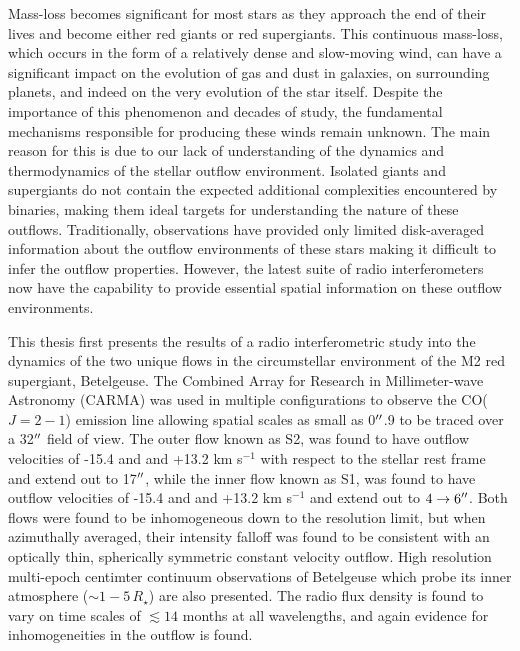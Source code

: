 
\begin{abstracts} 

Mass-loss becomes significant for most stars as they approach the end of their lives and become either red giants or red supergiants. This continuous mass-loss, which occurs in the form of a relatively dense and slow-moving wind, can have a significant impact on the evolution of gas and dust in galaxies, on surrounding planets, and indeed on the very evolution of the star itself.  Despite the importance of this phenomenon and decades of study,
the fundamental mechanisms responsible for producing these winds remain unknown. The main reason for this is due to our lack of understanding of the dynamics and thermodynamics of the stellar outflow environment. Isolated giants and supergiants do not contain the expected additional complexities encountered by binaries, making them ideal targets for understanding the nature of these outflows. Traditionally, observations have provided only limited disk-averaged information about the outflow environments of these stars making it difficult to infer the outflow properties. However, the latest suite of radio interferometers now have the capability to provide essential spatial information on these outflow environments.

This thesis first presents the results of a radio interferometric study into the dynamics of the two unique flows in the circumstellar environment of the  M2 red supergiant, Betelgeuse. The  Combined Array for Research in Millimeter-wave Astronomy (CARMA) was used in multiple configurations to observe the CO($J=2-1$) emission line allowing  spatial scales as small as 0$^{\prime\prime}$.9 to be traced over a 32$^{\prime\prime}$  field of view. The outer flow known as S2, was found to have outflow velocities of -15.4 and and +13.2 km s$^{-1}$ with respect to the stellar rest frame and extend out to 17$^{\prime\prime}$, while the inner flow known as S1, was found to have outflow velocities of -15.4 and and +13.2 km s$^{-1}$ and extend out to $4 \rightarrow 6^{\prime\prime}$. Both flows were found to be inhomogeneous down to the resolution limit, but when azimuthally averaged, their intensity falloff was found to be consistent with an optically thin, spherically symmetric constant velocity outflow. High resolution multi-epoch centimter continuum observations of Betelgeuse which probe its inner atmosphere ($\sim 1-5\,R_{\star}$) are also presented. The radio flux density is found to vary on time scales of $\lesssim 14$ months at all wavelengths, and again evidence for inhomogeneities in the outflow is found.


\end{abstracts}
